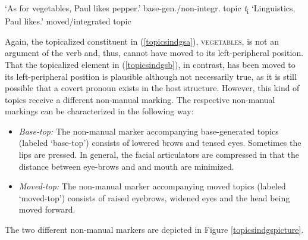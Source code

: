 \begin{exe}
\ex\label{topicsindgs}\begin{xlist} 
\ex {} 
%
\glt `As for vegetables, Paul likes pepper.' \label{topicsindgsa} \hfill base-gen./non-integr. topic
\ex {}  \textit{t}\textsubscript{i} 
%
\glt `Linguistics, Paul likes.' \label{topicsindgsb} \hfill moved/integrated topic
\end{xlist}
\end{exe}


\noindent Again, the topicalized constituent in (\ref{topicsindgsa}), \textsc{vegetables}, is not an argument of the verb and, thus, cannot have moved to its left-peripheral position. That the topicalized element in (\ref{topicsindgsb}), in contrast, has been moved to its left-peripheral position is plausible although not necessarily true, as it is still possible that a covert pronoun exists in the host structure. However, this kind of topics receive a different non-manual marking. The respective non-manual markings can be characterized in the following way:

\begin{itemize}[itemsep=0pt]
	\item \textit{Base-top:} The non-manual marker accompanying base-generated topics (labeled `base-top') consists of lowered brows and tensed eyes. Sometimes the lips are pressed. In general, the facial articulators are compressed in that the distance between eye-brows and and mouth are minimized.
	\item \textit{Moved-top:} The non-manual marker accompanying moved topics (labeled `moved-top') consists of raised eyebrows, widened eyes and the head being moved forward.
\end{itemize}

\noindent The two different non-manual markers are depicted in Figure \ref{topicsindgspicture}.

